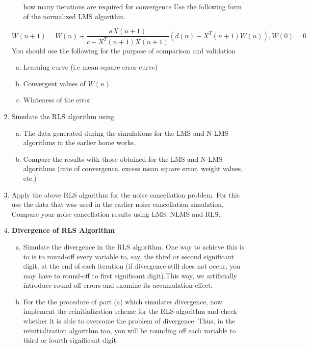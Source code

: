 \documentclass[journal,12pt,twocolumn]{IEEEtran}
\begin{document}
\begin{enumerate}
\begin{enumerate}[(a)]
how many iterations are required for convergence
%
Use the following form of the normalized LMS algorithm.
\end{enumerate}
%
$$W(n+1)=W(n)+\frac{aX(n+1)}{c+X^T(n+1)X(n+1)}(d(n)-X^T{(n+1)}W(n)),W(0)=0$$
%
You should use the following for the purpose of comparison and validation
\begin{enumerate}[(a)]
%
\item Learning curve (i.e mean square error curve)
\item Convergent values of $W(n)$
\item Whiteness of the error
\end{enumerate}
\item Simulate the RLS algorithm using
\begin{enumerate}[(a)]
\item The data generated during the simulations for the LMS and N-LMS algorithms in the earlier home works.
\item Compare the results with those obtained for the LMS and N-LMS algorithms (rate of convergence, excess
mean square error, weight values, etc.)
\end{enumerate}
%
\item Apply the above RLS algorithm for the noise cancellation problem. For this use the data that was used in the earlier
noise cancellation simulation. Compare your noise cancellation results using LMS, NLMS and RLS.
%
\item \textbf{Divergence of RLS Algorithm}
%
\begin{enumerate}[(a)]
\item Simulate the divergence in the RLS algorithm. One way to achieve this is to is to round-off every variable
to, say, the third or second significant digit, at the end of each iteration (if divergence still does not occur,
you may have to round-off to first significant digit).This way, we artificially introduce round-off errors and
examine its accumulation effect.
%
\item For the the procedure of part (a) which simulates divergence, now implement the reinitialization scheme
for the RLS algorithm and check whether it is able to overcome the problem of divergence. Thus, in the reinitialization algorithm too, you will be rounding off each variable to third or fourth significant digit.
\end{enumerate}
\end{enumerate}
\end{document}
